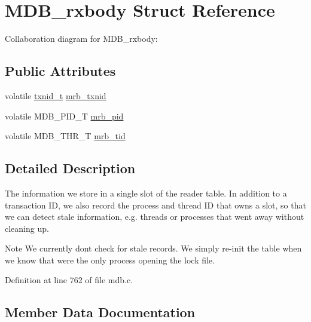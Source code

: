\hypertarget{struct_m_d_b__rxbody}{}\section{M\+D\+B\+\_\+rxbody Struct Reference}
\label{struct_m_d_b__rxbody}


Collaboration diagram for M\+D\+B\+\_\+rxbody\+:
\subsection*{Public Attributes}
\begin{DoxyCompactItemize}
\item 
volatile \mbox{\hyperlink{group__internal_gabbaef7c9c710f8652a62c32d748c040e}{txnid\+\_\+t}} \mbox{\hyperlink{struct_m_d_b__rxbody_ac88ac750e500b2080ab2fd379e1880fb}{mrb\+\_\+txnid}}
\item 
volatile M\+D\+B\+\_\+\+P\+I\+D\+\_\+T \mbox{\hyperlink{struct_m_d_b__rxbody_a154374dde6c1f0e480e6d92b4d6a1fc3}{mrb\+\_\+pid}}
\item 
volatile M\+D\+B\+\_\+\+T\+H\+R\+\_\+T \mbox{\hyperlink{struct_m_d_b__rxbody_ab7aceed58454ea79f33c4bc5c201e6ec}{mrb\+\_\+tid}}
\end{DoxyCompactItemize}


\subsection{Detailed Description}
The information we store in a single slot of the reader table. In addition to a transaction ID, we also record the process and thread ID that owns a slot, so that we can detect stale information, e.\+g. threads or processes that went away without cleaning up. \begin{DoxyNote}{Note}
We currently don\textquotesingle{}t check for stale records. We simply re-\/init the table when we know that we\textquotesingle{}re the only process opening the lock file. 
\end{DoxyNote}


Definition at line 762 of file mdb.\+c.



\subsection{Member Data Documentation}
\mbox{\label{struct_m_d_b__rxbody_a154374dde6c1f0e480e6d92b4d6a1fc3}} 
